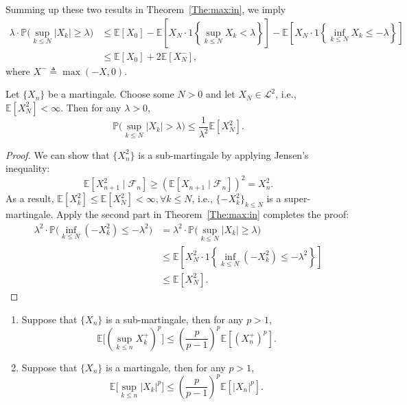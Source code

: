 \begin{remark}
Summing up these two results in Theorem~\ref{The:max:in}, we imply
\begin{align*}\lambda\cdot\mathbb{P}
\bigg(
\sup\limits_{k\le N}|X_k|\ge\lambda
\bigg)
&\le
 \mathbb{E}[X_0] - \mathbb{E}\left[X_N\cdot 1\left\{\sup\limits_{k\le N}X_k<\lambda\right\}\right]
 -\mathbb{E}\left[X_N\cdot 1\left\{\inf\limits_{k\le N}X_k\le-\lambda\right\}\right]\\
 &\le \mathbb{E}[X_0] + 2\mathbb{E}[X_N^-],
\end{align*}
where $X^-\triangleq\max(-X,0)$.
\end{remark}

\begin{theorem}
Let $\{X_n\}$ be a martingale. Choose some $N>0$ and let $X_N\in\mathcal{L}^2$, i.e., $\mathbb{E}[X_N^2]<\infty$. Then for any $\lambda>0$,
\[
\mathbb{P}\bigg(
\sup\limits_{k\le N}|X_k|>\lambda
\bigg)\le\frac{1}{\lambda^2}\mathbb{E}[X_N^2].
\]
\end{theorem}

\begin{proof}
We can show that $\{X_n^2\}$ is a sub-martingale by applying Jensen's inequality:
\[
\mathbb{E}[X_{n+1}^2\mid\mathcal{F}_n]\ge \left(
\mathbb{E}[X_{n+1}\mid\mathcal{F}_n]
\right)^2=X_n^2.
\]
As a result, $\mathbb{E}[X_k^2]\le\mathbb{E}[X_N^2]<\infty, \forall k\le N$, i.e., $\{-X_k^2\}_{k\le N}$ is a super-martingale.
Apply the second part in Theorem~\ref{The:max:in} completes the proof:
\begin{align*}
\lambda^2\cdot\mathbb{P}\bigg(
\inf\limits_{k\le N}(-X_k^2)\le-\lambda^2
\bigg)
&=\lambda^2\cdot\mathbb{P}\bigg(
\sup\limits_{k\le N}|X_k|\ge\lambda
\bigg)\\
&\le 
\mathbb{E}\left[X_N^2\cdot 1\left\{\inf\limits_{k\le N}(-X_k^2)\le-\lambda^2\right\}\right]\\
&\le \mathbb{E}[X_N^2].
\end{align*}


\end{proof}

\begin{theorem}
\begin{enumerate}
\item
Suppose that $\{X_n\}$ is a sub-martingale, then for any $p>1$,
\[
\mathbb{E}\bigg[
\left(
\sup\limits_{k\le n}X_k^+
\right)^p
\bigg]\le \left(
\frac{p}{p-1}
\right)^p\mathbb{E}[(X_n^+)^p].
\]
\item
Suppose that $\{X_n\}$ is a martingale, then for any $p>1$,
\[
\mathbb{E}\bigg[
\sup\limits_{k\le n}|X_k|^p
\bigg]\le \left(
\frac{p}{p-1}
\right)^p\mathbb{E}[|X_n|^p].
\]
\end{enumerate}
\end{theorem}


